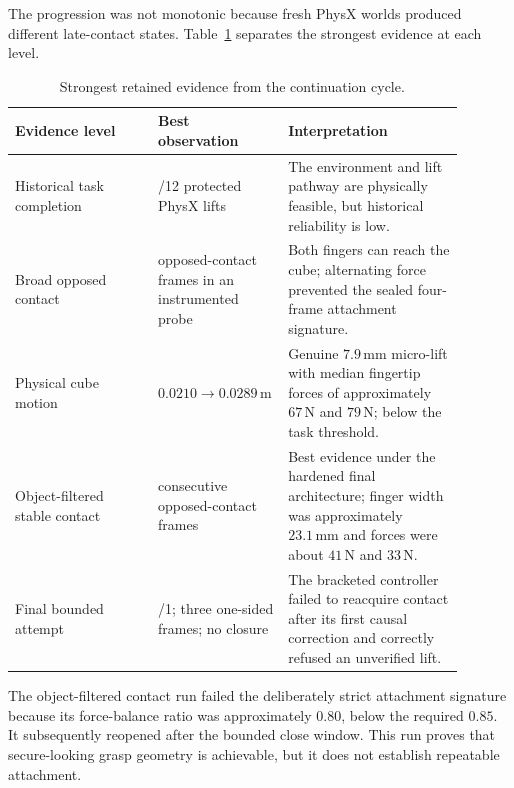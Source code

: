 The progression was not monotonic because fresh PhysX worlds produced
different late-contact states.  Table~\ref{tab:franka-evidence-ladder}
separates the strongest evidence at each level.

\begin{table}[H]
\centering
\caption{Strongest retained evidence from the continuation cycle.}
\label{tab:franka-evidence-ladder}
\begin{tabular}{>{\raggedright\arraybackslash}p{0.31\linewidth}
                >{\raggedright\arraybackslash}p{0.20\linewidth}
                >{\raggedright\arraybackslash}p{0.38\linewidth}}
\toprule
Evidence level & Best observation & Interpretation \\
\midrule
Historical task completion & 2/12 protected PhysX lifts & The environment and
lift pathway are physically feasible, but historical reliability is low. \\

Broad opposed contact & 88 opposed-contact frames in an instrumented probe &
Both fingers can reach the cube; alternating force prevented the sealed
four-frame attachment signature. \\

Physical cube motion & $0.0210\rightarrow0.0289\,\mathrm{m}$ & Genuine
$7.9\,\mathrm{mm}$ micro-lift with median fingertip forces of approximately
$67\,\mathrm{N}$ and $79\,\mathrm{N}$; below the task threshold. \\

Object-filtered stable contact & 19 consecutive opposed-contact frames & Best
evidence under the hardened final architecture; finger width was approximately
$23.1\,\mathrm{mm}$ and forces were about $41\,\mathrm{N}$ and
$33\,\mathrm{N}$. \\

Final bounded attempt & 0/1; three one-sided frames; no closure & The bracketed
controller failed to reacquire contact after its first causal correction and
correctly refused an unverified lift. \\
\bottomrule
\end{tabular}
\end{table}

The object-filtered contact run failed the deliberately strict attachment
signature because its force-balance ratio was approximately $0.80$, below the
required $0.85$.  It subsequently reopened after the bounded close window.
This run proves that secure-looking grasp geometry is achievable, but it does
not establish repeatable attachment.


